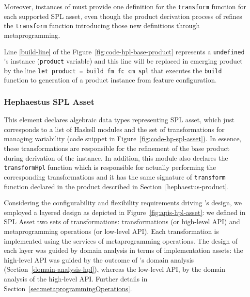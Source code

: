 Moreover, instances of \hpl{} must provide one definition for the
\texttt{transform} function for each supported SPL asset, even though
the product derivation process of \hpl{} refines the \texttt{transform} function
introducing those new definitions through metaprogramming.

Line \ref{build-line} of the Figure~\ref{fig:code-hpl-base-product}
represents a \texttt{undefined} \hpl's instance (\texttt{product} variable) and this line will be replaced in emerging product by the line \texttt{let product = build fm fc cm spl} that executes the \texttt{build} function to generation of a product \hpl{} instance from feature configuration.





\subsubsection{Hephaestus SPL Asset} \label{hephaestus-spl-asset}

This element declares algebraic data types representing \hp{} SPL asset, which just
corresponds to a list of Haskell modules and the set of transformations for managing \hpl{} variability (code snippet in Figure~\ref{fig:code-hp-spl-asset}). In essence, these transformations are responsible for the refinement of the base product during derivation of
the \hpl{} instance. In addition, this module also declares the \texttt{transformHpl} function which is responsible for actually performing the corresponding \hpl{} transformations and it has the same signature of \texttt{transform} function declared in the \hp{} product described in Section~\ref{hephaestus-product}.

Considering the configurability and flexibility requirements driving \hpl's design, we employed a layered design as depicted in Figure~\ref{fig:apis-hpl-asset}:  we defined in \hp{} SPL Asset two sets of transformations: \hpl{} transformations (or high-level API)
and metaprogramming operations (or low-level API). Each \hpl{} transformation is implemented using the services of metaprogramming operations.
The design of each layer was guided by domain analysis in terms of implementation assets: the high-level API was guided by the outcome of \hpl{}'s domain analysis  (Section~\ref{domain-analysis-hpl}), whereas  the low-level API, by the domain analysis of the high-level API. Further details in Section~\ref{sec:metaprogrammingOperations}.


